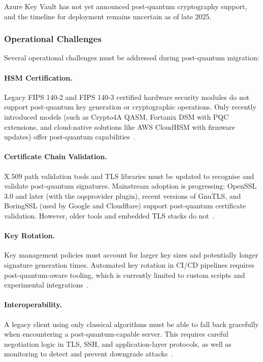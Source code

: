 \documentclass[12pt,a4paper]{article}
\begin{document}
Azure Key Vault has not yet announced post-quantum cryptography support, and the timeline for deployment remains uncertain as of late 2025.

\subsubsection{Operational Challenges}

Several operational challenges must be addressed during post-quantum migration:

\paragraph{HSM Certification.}
Legacy FIPS 140-2 and FIPS 140-3 certified hardware security modules do not support post-quantum key generation or cryptographic operations. Only recently introduced models (such as Crypto4A QASM, Fortanix DSM with PQC extensions, and cloud-native solutions like AWS CloudHSM with firmware updates) offer post-quantum capabilities~\cite{thales-pqc-hsm-2025,fortanix-pqc-2025}.

\paragraph{Certificate Chain Validation.}
X.509 path validation tools and TLS libraries must be updated to recognise and validate post-quantum signatures. Mainstream adoption is progressing: OpenSSL 3.0 and later (with the oqsprovider plugin), recent versions of GnuTLS, and BoringSSL (used by Google and Cloudflare) support post-quantum certificate validation. However, older tools and embedded TLS stacks do not~\cite{ietf-lamps-mldsa-certs-2024}.

\paragraph{Key Rotation.}
Key management policies must account for larger key sizes and potentially longer signature generation times. Automated key rotation in CI/CD pipelines requires post-quantum-aware tooling, which is currently limited to custom scripts and experimental integrations~\cite{aws-kms-mldsa-2025}.

\paragraph{Interoperability.}
A legacy client using only classical algorithms must be able to fall back gracefully when encountering a post-quantum-capable server. This requires careful negotiation logic in TLS, SSH, and application-layer protocols, as well as monitoring to detect and prevent downgrade attacks~\cite{nist-sp800-227-2024}.
\end{document}
